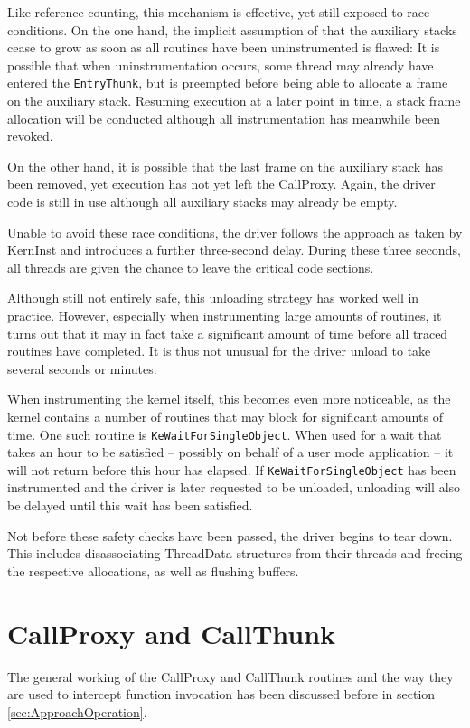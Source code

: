 Like reference counting, this mechanism is effective, yet still
exposed to race conditions. On the one hand, the implicit
assumption of that the auxiliary stacks cease to grow as soon as
all routines have been uninstrumented is flawed: It is possible
that when uninstrumentation occurs, some thread may already have entered
the \verb|EntryThunk|, but is preempted before being able to allocate a frame 
on the auxiliary stack. Resuming execution at a later point in time,
a stack frame allocation will be conducted although all instrumentation 
has meanwhile been revoked.

On the other hand, it is possible that the last frame on the auxiliary 
stack has been removed, yet execution has not yet left the CallProxy. 
Again, the driver code is still in use although all auxiliary stacks
may already be empty.

Unable to avoid these race conditions, the driver follows the approach
as taken by KernInst \citep{tamches99finegrained,Tamches01} and introduces a further three-second delay. During these
three seconds, all threads are given the chance to leave the critical code
sections.

Although still not entirely safe, this unloading strategy has worked
well in practice. However, especially when instrumenting large 
amounts of routines, it turns out that it may in fact take a significant 
amount of time before all traced routines have completed. It is thus not unusual
for the driver unload to take several seconds or minutes.

When instrumenting the kernel itself, this becomes even more noticeable, as
the kernel contains a number of routines that may block for significant
amounts of time. One such routine is \verb|KeWaitForSingleObject|. When used
for a wait that takes an hour to be satisfied -- possibly on behalf of a 
user mode application -- it will not return before this hour has elapsed.
If \verb|KeWaitForSingleObject| has been instrumented and the driver is
later requested to be unloaded, unloading will also be delayed until this wait
has been satisfied. 

Not before these safety checks have been passed, the driver begins to tear down.
This includes disassociating ThreadData structures from their threads and 
freeing the respective allocations, as well as flushing buffers.

\section{CallProxy and CallThunk}
The general working of the CallProxy and CallThunk routines and the way
they are used to intercept function invocation has been discussed
before in section \ref{sec:ApproachOperation}. 

